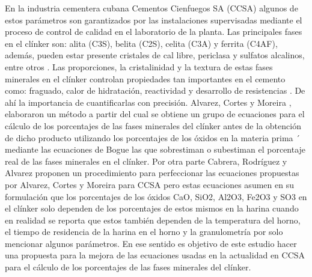 \documentclass[spanish]{report}
\begin{document}
En la industria cementera cubana Cementos Cienfuegos SA (CCSA) algunos de estos parámetros son garantizados por las instalaciones supervisadas mediante el proceso de control de calidad en el laboratorio de la planta. Las principales fases en el clínker son: alita (C3S), belita (C2S), celita (C3A) y ferrita (C4AF), además, pueden estar presente cristales de cal libre, periclasa y sulfatos alcalinos, entre otros \cite{tobon2007replanteamiento}. Las proporciones, la cristalinidad y la textura de estas fases minerales en el clínker controlan propiedades tan importantes en el cemento como: fraguado, calor de hidratación, reactividad y desarrollo de resistencias \cite{holderbank1975} \cite{glasser1998burning}. De ahí la importancia de cuantificarlas con precisión. Alvarez, Cortes y Moreira \cite{cortes2017metodo}, elaboraron un método a partir del cual se obtiene un grupo de ecuaciones para el cálculo de los porcentajes de las fases minerales del clínker antes de la obtención de dicho producto utilizando los porcentajes de los óxidos en la materia prima ´ mediante las ecuaciones de Bogue las que sobrestiman o subestiman el porcentaje real de las fases minerales en el clínker. Por otra parte Cabrera, Rodríguez y Alvarez \cite{alvarez2021perfeccionamiento} proponen un procedimiento para perfeccionar las ecuaciones propuestas por Alvarez, Cortes y Moreira para CCSA pero estas ecuaciones asumen en su formulación que los porcentajes de los óxidos CaO, SiO2, Al2O3, Fe2O3 y SO3 en el clínker solo dependen de los porcentajes de estos mismos en la harina cuando en realidad se reporta que estos también dependen de la temperatura del horno, el tiempo de residencia de la harina en el horno y la granulometría por solo mencionar algunos parámetros. En ese sentido es objetivo de este estudio hacer una propuesta para la mejora de las ecuaciones usadas en la actualidad en CCSA para el cálculo de los porcentajes de las fases minerales del clínker.
\end{document}
